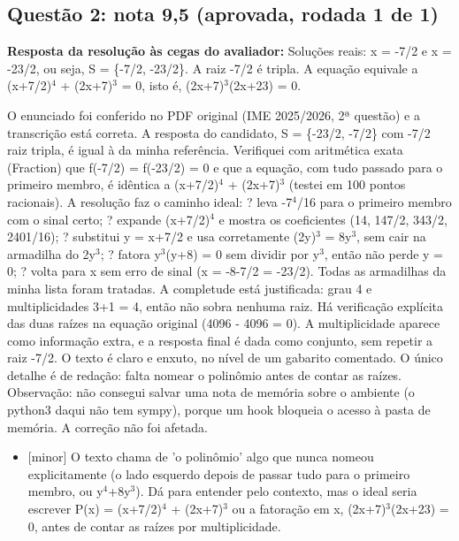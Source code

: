 \documentclass{article}%
\begin{document}
\subsection*{Questão 2: nota 9,5 (aprovada, rodada 1 de 1)}%
\textbf{Resposta da resolução às cegas do avaliador:} Soluções reais: x = -7/2 e x = -23/2, ou seja, S = \{-7/2, -23/2\}. A raiz -7/2 é tripla. A equação equivale a (x+7/2)$^{4}$ + (2x+7)$^3$ = 0, isto é, (2x+7)$^3$(2x+23) = 0.\par %
O enunciado foi conferido no PDF original (IME 2025/2026, 2ª questão) e a transcrição está correta. A resposta do candidato, S = \{-23/2, -7/2\} com -7/2 raiz tripla, é igual à da minha referência. Verifiquei com aritmética exata (Fraction) que f(-7/2) = f(-23/2) = 0 e que a equação, com tudo passado para o primeiro membro, é idêntica a (x+7/2)$^{4}$ + (2x+7)$^3$ (testei em 100 pontos racionais).\newline%
\newline%
A resolução faz o caminho ideal:\newline%
? leva -7$^{4}$/16 para o primeiro membro com o sinal certo;\newline%
? expande (x+7/2)$^{4}$ e mostra os coeficientes (14, 147/2, 343/2, 2401/16);\newline%
? substitui y = x+7/2 e usa corretamente (2y)$^3$ = 8y$^3$, sem cair na armadilha do 2y$^3$;\newline%
? fatora y$^3$(y+8) = 0 sem dividir por y$^3$, então não perde y = 0;\newline%
? volta para x sem erro de sinal (x = -8-7/2 = -23/2).\newline%
\newline%
Todas as armadilhas da minha lista foram tratadas. A completude está justificada: grau 4 e multiplicidades 3+1 = 4, então não sobra nenhuma raiz. Há verificação explícita das duas raízes na equação original (4096 - 4096 = 0). A multiplicidade aparece como informação extra, e a resposta final é dada como conjunto, sem repetir a raiz -7/2. O texto é claro e enxuto, no nível de um gabarito comentado. O único detalhe é de redação: falta nomear o polinômio antes de contar as raízes.\newline%
\newline%
Observação: não consegui salvar uma nota de memória sobre o ambiente (o python3 daqui não tem sympy), porque um hook bloqueia o acesso à pasta de memória. A correção não foi afetada.%
\begin{itemize}%
\item%
{[}minor{]} O texto chama de 'o polinômio' algo que nunca nomeou explicitamente (o lado esquerdo depois de passar tudo para o primeiro membro, ou y$^{4}$+8y$^3$). Dá para entender pelo contexto, mas o ideal seria escrever P(x) = (x+7/2)$^{4}$ + (2x+7)$^3$ ou a fatoração em x, (2x+7)$^3$(2x+23) = 0, antes de contar as raízes por multiplicidade.%
\end{itemize}%
\end{document}
